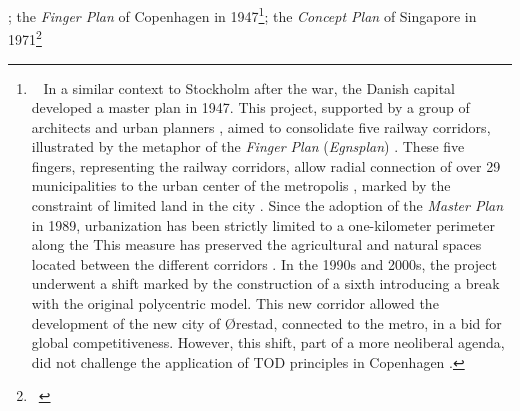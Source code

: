 \begin{refsegment}
{}; the \textsl{Finger Plan} of Copenhagen in 1947\footnote{~
    In a similar context to Stockholm after the war, the Danish capital developed a master plan in 1947. This project, supported by a group of architects and urban planners \textcolor{blue}{\autocite[p.~132-153 (Chapter~5)]{cervero_transit_1998}}, aimed to consolidate five railway corridors, illustrated by the metaphor of the \textsl{Finger Plan} (\textsl{Egnsplan}) \textcolor{blue}{\autocite[123-128]{teknisk_kontor_for_udvalget_til_planlaegning_af_kobenhavnsegnen_skitseforslag_1947}}. These five fingers, representing the railway corridors, allow radial connection of over 29 municipalities to the urban center of the metropolis \textcolor{blue}{\autocite[]{fullerton_scandinavia_1991}}, marked by the constraint of limited land in the city \textcolor{blue}{\autocites[254]{knowles_transit_2012}[4-6]{the_danish_nature_agency_finger_2015}}. Since the adoption of the \textsl{Master Plan} in 1989, urbanization has been strictly limited to a one-kilometer perimeter along the  This measure has preserved the agricultural and natural spaces located between the different corridors \textcolor{blue}{\autocite[224]{vuk_transport_2005}}. In the 1990s and 2000s, the project underwent a shift marked by the construction of a sixth  introducing a break with the original polycentric model. This new corridor allowed the development of the new city of Ørestad, connected to the metro, in a bid for global competitiveness. However, this shift, part of a more neoliberal agenda, did not challenge the application of \acrshort{TOD} principles in Copenhagen \textcolor{blue}{\autocites[103-105]{majoor_progressive_2008}[254]{knowles_transit_2012}}.
}; the \textsl{Concept Plan} of Singapore in 1971\footnote{~
}
\end{refsegment}
